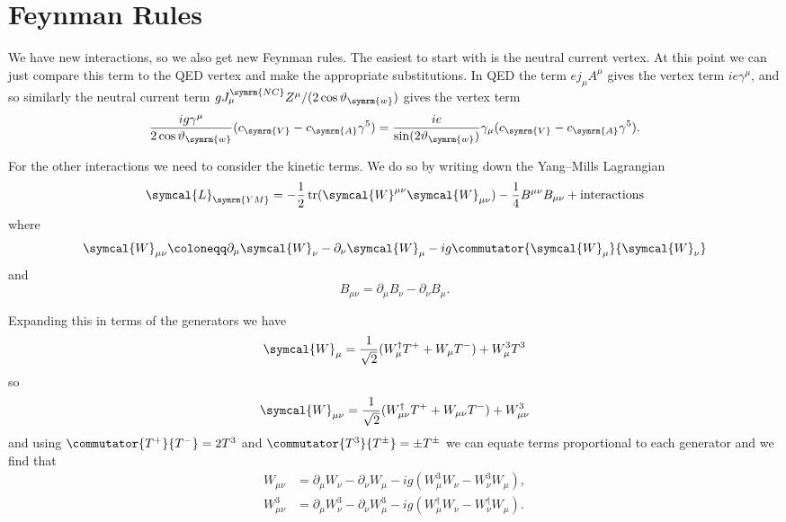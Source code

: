 \documentclass[fleqn]{NotesClass}
\newcommand{\hermit}{\dagger}
\newcommand{\lagrangianDensity}{\symcal{L}}
\DeclareMathOperator{\tr}{tr}
\newcommand{\gaugeW}{\symcal{W}}
\newcommand{\weinbergangle}{\vartheta_{\symrm{w}}}
\newcommand{\neutralCurrent}{\symrm{NC}}
\newcommand{\cV}{c_{\symrm{V}}}
\newcommand{\cA}{c_{\symrm{A}}}
\newcommand{\yangmills}{\symrm{YM}}
\begin{document}
    \section{Feynman Rules}
    We have new interactions, so we also get new Feynman rules.
    The easiest to start with is the neutral current vertex.
    At this point we can just compare this term to the QED vertex and make the appropriate substitutions.
    In QED the term \(ej_\mu A^\mu\) gives the vertex term \(ie\gamma^\mu\), and so similarly the neutral current term \(gJ^{\neutralCurrent}_\mu Z^\mu/(2\cos\weinbergangle)\) gives the vertex term
    \begin{equation}
        \frac{ig\gamma^\mu}{2\cos\weinbergangle}(\cV - \cA\gamma^5) = \frac{ie}{\sin(2\weinbergangle)} \gamma_\mu(\cV - \cA \gamma^5).
    \end{equation}
    
    For the other interactions we need to consider the kinetic terms.
    We do so by writing down the Yang--Mills Lagrangian
    \begin{equation}
        \lagrangianDensity_{\yangmills} = -\frac{1}{2}\tr(\gaugeW^{\mu\nu}\gaugeW_{\mu\nu}) - \frac{1}{4}B^{\mu\nu}B_{\mu\nu} + \text{interactions}
    \end{equation}
    where
    \begin{equation}
        \gaugeW_{\mu\nu} \coloneqq \partial_\mu \gaugeW_\nu - \partial_\nu \gaugeW_\mu - ig\commutator{\gaugeW_\mu}{\gaugeW_\nu}
    \end{equation}
    and
    \begin{equation}
        B_{\mu\nu} = \partial_\mu B_\nu - \partial_\nu B_\mu.
    \end{equation}
    
    Expanding this in terms of the generators we have
    \begin{equation}
        \gaugeW_\mu = \frac{1}{\sqrt{2}}(W_\mu^\hermit T^+ + W_\mu T^-) + W^3_\mu T^3
    \end{equation}
    so
    \begin{equation}
        \gaugeW_{\mu\nu} = \frac{1}{\sqrt{2}}(W^\hermit_{\mu\nu}T^+ + W_{\mu\nu}T^-) + W^3_{\mu\nu}
    \end{equation}
    and using \(\commutator{T^+}{T^-} = 2T^3\) and \(\commutator{T^3}{T^{\pm}} = \pm T^{\pm}\) we can equate terms proportional to each generator and we find that
    \begin{align}
        W_{\mu\nu} &= \partial_\mu W_\nu - \partial_\nu W_\mu -ig(W^3_\mu W_\nu - W^3_\nu W_\mu),\\
        W^3_{\mu\nu} &= \partial_\mu W^3_\nu - \partial_\nu W^3_\mu - ig(W_\mu^\hermit W_\nu - W_\nu^\hermit W_\mu).
    \end{align}
    
\end{document}
